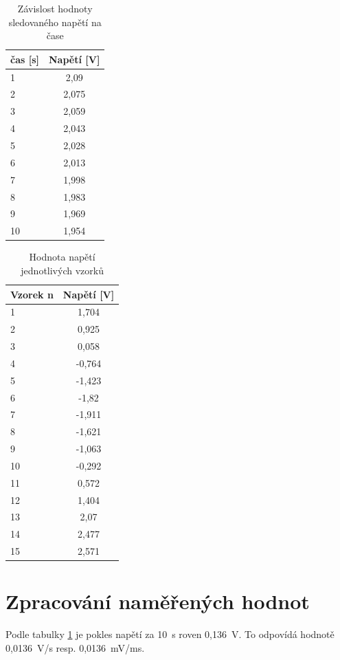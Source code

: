 \documentclass[a4paper,12pt]{article}   %
\begin{document}
\begin{table}[h!]
  \centering  
  \begin{tabular}{|l|c|}
    \hline
    čas [s]&Napětí [V]\\\hline\hline
    1&2,09  \\\hline
    2&2,075 \\\hline
    3&2,059 \\\hline
    4&2,043 \\\hline
    5&2,028 \\\hline
    6&2,013 \\\hline
    7&1,998 \\\hline
    8&1,983 \\\hline
    9&1,969 \\\hline
    10&1,954 \\\hline
  \end{tabular}
  \caption{Závislost hodnoty sledovaného napětí na čase}
  \label{tab:sledovane}  
\end{table}

\begin{table}[h!]
  \centering
  \begin{tabular}{|l|c|}
    \hline
    Vzorek n&Napětí [V] \\\hline\hline
    1&1,704\\\hline
    2&0,925\\\hline
    3&0,058\\\hline
    4&-0,764\\\hline
    5&-1,423\\\hline
    6&-1,82\\\hline
    7&-1,911\\\hline
    8&-1,621\\\hline
    9&-1,063\\\hline
    10&-0,292\\\hline
    11&0,572\\\hline
    12&1,404\\\hline
    13&2,07\\\hline
    14&2,477\\\hline
    15&2,571\\\hline
  \end{tabular}
  \caption{Hodnota napětí jednotlivých vzorků}
  \label{tab:vzorky}  
\end{table}



\section{Zpracování naměřených hodnot}
\label{chap:zpracovani_hodnot}
Podle tabulky \ref{tab:sledovane} je pokles napětí za 10~s roven 0,136~V. To odpovídá hodnotě 0,0136~V/s resp. 0,0136~mV/ms.
\end{document}
